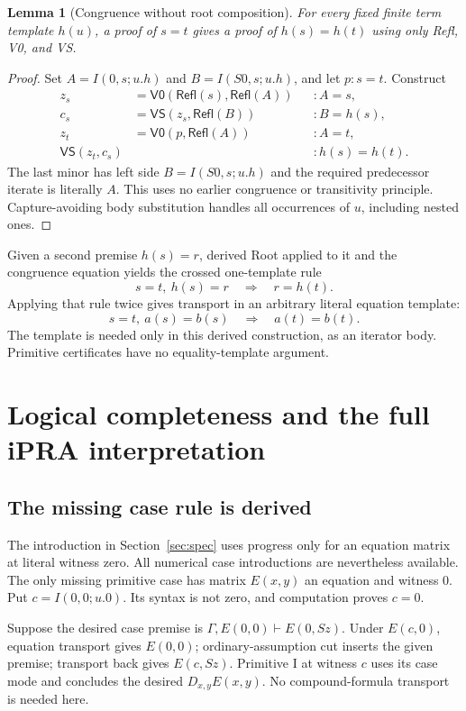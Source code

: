 \documentclass[11pt,letterpaper]{article}
\newtheorem{lemma}[theorem]{Lemma}
\theoremstyle{definition}
\newcommand{\Refl}{\mathsf{Refl}}
\newcommand{\VZ}{\mathsf{V0}}
\newcommand{\VS}{\mathsf{VS}}
\begin{document}
\begin{lemma}[Congruence without root composition]
For every fixed finite term template $h(u)$, a proof of $s=t$
gives a proof of $h(s)=h(t)$ using only Refl, V0, and VS.
\end{lemma}
\begin{proof}
Set $A=I(0,s;u.h)$ and $B=I(S0,s;u.h)$, and let $p:s=t$.
Construct
\begin{align*}
 z_s&=\VZ(\Refl(s),\Refl(A))&&:A=s,\\
 c_s&=\VS(z_s,\Refl(B))&&:B=h(s),\\
 z_t&=\VZ(p,\Refl(A))&&:A=t,\\
 \VS(z_t,c_s)&&&:h(s)=h(t).
\end{align*}
The last minor has left side $B=I(S0,s;u.h)$ and the required
predecessor iterate is literally $A$. This uses no earlier
congruence or transitivity principle. Capture-avoiding body
substitution handles all occurrences of $u$, including nested ones.
\end{proof}

Given a second premise $h(s)=r$, derived Root applied to it and
the congruence equation yields the crossed one-template rule
\[
               s=t,\ h(s)=r\quad\Longrightarrow\quad r=h(t).
\]
Applying that rule twice gives transport in an arbitrary literal
equation template:
\[
               s=t,\ a(s)=b(s)\quad\Longrightarrow\quad a(t)=b(t).
\]
The template is needed only in this derived construction, as an
iterator body. Primitive certificates have no equality-template
argument.

\section{Logical completeness and the full iPRA interpretation}
\label{sec:bridge}

\subsection{The missing case rule is derived}

The introduction in Section~\ref{sec:spec} uses progress only for
an equation matrix at literal witness zero. All numerical case
introductions are nevertheless available. The only missing
primitive case has matrix $E(x,y)$ an equation and witness $0$.
Put $c=I(0,0;u.0)$. Its syntax is not zero, and computation
proves $c=0$.

Suppose the desired case premise is
$\Gamma,E(0,0)\vdash E(0,Sz)$. Under $E(c,0)$, equation
transport gives $E(0,0)$; ordinary-assumption cut inserts the
given premise; transport back gives $E(c,Sz)$. Primitive I
at witness $c$ uses its case mode and concludes the desired
$D_{x,y}E(x,y)$. No compound-formula transport is needed here.
\end{document}
